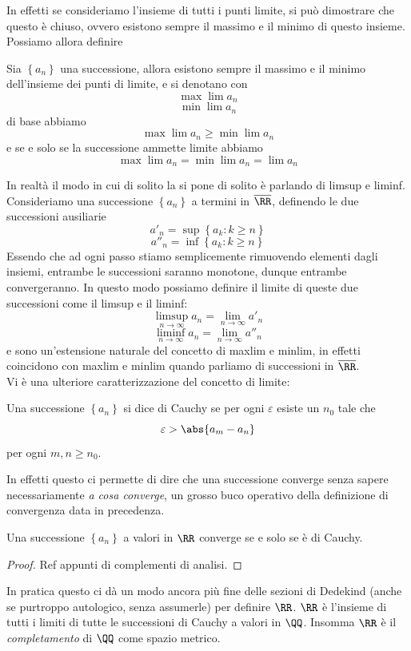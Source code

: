 \documentclass[11pt]{scrartcl}
\begin{document}
	In effetti se consideriamo l'insieme di tutti i punti limite, si può dimostrare che questo è chiuso, ovvero esistono sempre il massimo e il minimo di questo insieme. Possiamo allora definire
	\begin{definition}
		Sia $\left\{a_n\right\}$ una successione, allora esistono sempre il massimo e il minimo dell'insieme dei punti di limite, e si denotano con
		$$\max\lim a_n$$
		$$\min\lim a_n$$
		di base abbiamo
		$$\max\lim a_n \ge \min\lim a_n$$
		e se e solo se la successione ammette limite abbiamo
		$$\max\lim a_n = \min\lim a_n = \lim a_n$$
	\end{definition}
	In realtà il modo in cui di solito la si pone di solito è parlando di limsup e liminf. Consideriamo una successione $\left\{a_n\right\}$ a termini in $\overline{\RR}$, definendo le due successioni ausiliarie
	$$a'_n=\sup\left\{a_k:k\ge n\right\}$$
	$$a''_n=\inf\left\{a_k:k\ge n\right\}$$
	Essendo che ad ogni passo stiamo semplicemente rimuovendo elementi dagli insiemi, entrambe le successioni saranno monotone, dunque entrambe convergeranno. In questo modo possiamo definire il limite di queste due successioni come il limsup e il liminf:
	$$\limsup_{n\to\infty} a_n=\lim_{n\to\infty} a'_n$$
	$$\liminf_{n\to\infty} a_n=\lim_{n\to\infty} a''_n$$
	e sono un'estensione naturale del concetto di maxlim e minlim, in effetti coincidono con maxlim e minlim quando parliamo di successioni in $\overline{\RR}$. \\
	Vi è una ulteriore caratterizzazione del concetto di limite:
	\begin{definition}
		Una successione $\left\{a_n\right\}$ si dice di Cauchy se per ogni $\varepsilon$ esiste un $n_0$ tale che
		$$\varepsilon>\abs{a_m-a_n}$$ per ogni $m,n\ge n_0$.
	\end{definition}
	In effetti questo ci permette di dire che una successione converge senza sapere necessariamente \textit{a cosa converge}, un grosso buco operativo della definizione di convergenza data in precedenza.
	\begin{theorem}
		Una successione $\left\{a_n\right\}$ a valori in $\RR$ converge se e solo se è di Cauchy.
	\end{theorem}
	\begin{proof}
		Ref appunti di complementi di analisi.
	\end{proof}
	In pratica questo ci dà un modo ancora più fine delle sezioni di Dedekind (anche se purtroppo autologico, senza assumerle) per definire $\RR$. $\RR$ è l'insieme di tutti i limiti di tutte le successioni di Cauchy a valori in $\QQ$. Insomma $\RR$ è il \textit{completamento} di $\QQ$ come spazio metrico.
	
\end{document}
